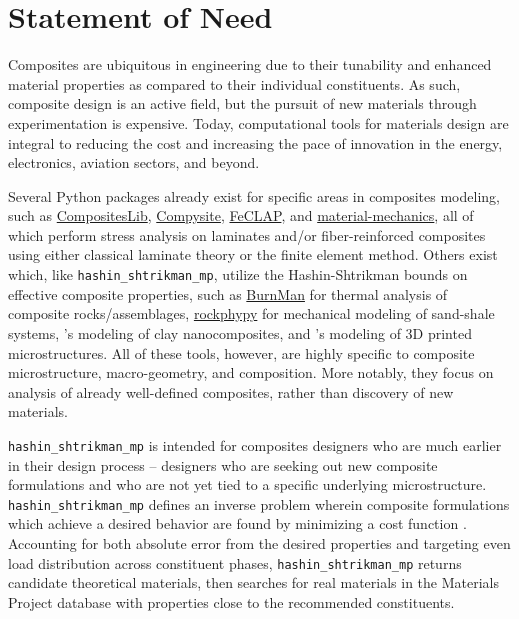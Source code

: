 \documentclass[letterpaper,12pt]{formatfile}
\begin{document}
\section{Statement of Need} \label{sec:need}

Composites are ubiquitous in engineering due to their tunability and enhanced material properties as compared to their individual constituents. As such, composite design is an active field, but the pursuit of new materials through experimentation is expensive. Today, computational tools for materials design are integral to reducing the cost and increasing the pace of innovation in the energy, electronics, aviation sectors, and beyond.

Several Python packages already exist for specific areas in composites modeling, such as \href{https://github.com/rafaelcidade/compositeslib}{CompositesLib}, \href{https://github.com/echaffey/Compysite}{Compysite}, \href{https://github.com/azzeddinetiba/FeCLAP}{FeCLAP}, and \href{https://pypi.org/project/material-mechanics/}{material-mechanics}, all of which perform stress analysis on laminates and/or fiber-reinforced composites using either classical laminate theory or the finite element method. Others exist which, like \verb|hashin_shtrikman_mp|, utilize the Hashin-Shtrikman bounds on effective composite properties, such as  \href{https://geodynamics.github.io/burnman/}{BurnMan} for thermal analysis of composite rocks/assemblages, \href{https://rockphypy.readthedocs.io/en/latest/getting_started/08_Shaly_sand_modelling.html}{rockphypy} for mechanical modeling of sand-shale systems, \citep{ZARE2017176}'s modeling of clay nanocomposites, and \citep{ZERHOUNI2019344}'s modeling of 3D printed microstructures. All of these tools, however, are highly specific to composite microstructure, macro-geometry, and composition. More notably, they focus on analysis of already well-defined composites, rather than discovery of new materials.

\verb|hashin_shtrikman_mp| is intended for composites designers who are much earlier in their design process -- designers who are seeking out new composite formulations and who are not yet tied to a specific underlying microstructure. \verb|hashin_shtrikman_mp| defines an inverse problem wherein composite formulations which achieve a desired behavior are found by minimizing a cost function \citep{zohdi2012electromagnetic}. Accounting for both absolute error from the desired properties and targeting even load distribution across constituent phases, \verb|hashin_shtrikman_mp| returns candidate theoretical materials, then searches for real materials in the Materials Project database with properties close to the recommended constituents. 
\end{document}
